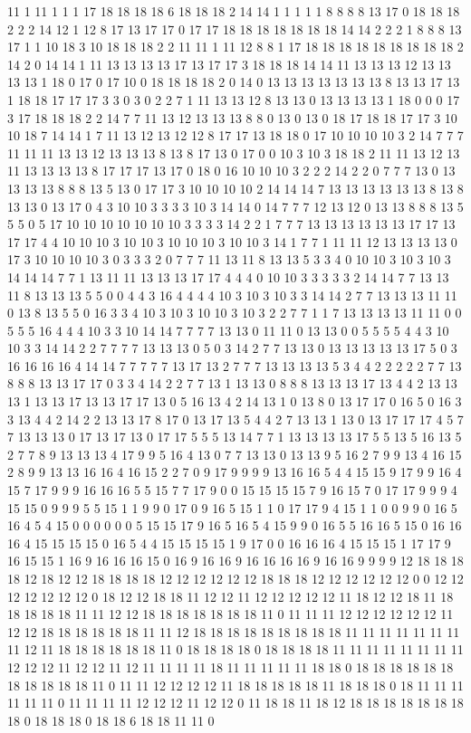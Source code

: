 11 1 11 1 1 1 17 18 18 18 18 6 18 18 18 2 14 14 1 1 1 1 1 8 8 8 8 13 17 0 18 18 18 2 2 2 14 12 1 12 8 17 13 17 17 0 17 17 18 18 18 18 18 18 18 14 14 2 2 2 1 8 8 8 13 17 1 1 10 18 3 10 18 18 18 2 2 11 11 1 11 12 8 8 1 17 18 18 18 18 18 18 18 18 18 2 14 2 0 14 14 1 11 13 13 13 13 17 13 17 17 3 18 18 18 14 14 11 13 13 13 12 13 13 13 13 1 18 0 17 0 17 10 0 18 18 18 18 2 0 14 0 13 13 13 13 13 13 13 8 13 13 17 13 1 18 18 17 17 17 3 3 0 3 0 2 2 7 1 11 13 13 12 8 13 13 0 13 13 13 13 1 18 0 0 0 17 3 17 18 18 18 2 2 14 7 7 11 13 12 13 13 13 8 8 0 13 0 13 0 18 17 18 18 17 17 3 10 10 18 7 14 14 1 7 11 13 12 13 12 12 8 17 17 13 18 18 0 17 10 10 10 10 3 2 14 7 7 7 11 11 11 13 13 12 13 13 13 8 13 8 17 13 0 17 0 0 10 3 10 3 18 18 2 11 11 13 12 13 11 13 13 13 13 8 17 17 17 13 17 0 18 0 16 10 10 10 3 2 2 2 14 2 2 0 7 7 7 13 0 13 13 13 13 8 8 8 13 5 13 0 17 17 3 10 10 10 10 2 14 14 14 7 13 13 13 13 13 13 8 13 8 13 13 0 13 17 0 4 3 10 10 3 3 3 3 10 3 14 14 0 14 7 7 7 12 13 12 0 13 13 8 8 8 13 5 5 5 0 5 17 10 10 10 10 10 10 10 3 3 3 3 14 2 2 1 7 7 7 13 13 13 13 13 13 17 17 13 17 17 4 4 10 10 10 3 10 10 3 10 10 10 3 10 10 3 14 1 7 7 1 11 11 12 13 13 13 13 0 17 3 10 10 10 10 3 0 3 3 3 2 0 7 7 7 11 13 11 8 13 13 5 3 3 4 0 10 10 3 10 3 10 3 14 14 14 7 7 1 13 11 11 13 13 13 17 17 4 4 4 0 10 10 3 3 3 3 3 2 14 14 7 7 13 13 11 8 13 13 13 5 5 0 0 4 4 3 16 4 4 4 4 10 3 10 3 10 3 3 14 14 2 7 7 13 13 13 11 11 0 13 8 13 5 5 0 16 3 3 4 10 3 10 3 10 10 3 10 3 2 2 7 7 1 1 7 13 13 13 13 11 11 0 0 5 5 5 16 4 4 4 10 3 3 10 14 14 7 7 7 7 13 13 0 11 11 0 13 13 0 0 5 5 5 5 4 4 3 10 10 3 3 14 14 2 2 7 7 7 7 13 13 13 0 5 0 3 14 2 7 7 13 13 0 13 13 13 13 13 17 5 0 3 16 16 16 16 4 14 14 7 7 7 7 7 13 17 13 2 7 7 7 13 13 13 13 5 3 4 4 2 2 2 2 2 7 7 13 8 8 8 13 13 17 17 0 3 3 4 14 2 2 7 7 13 1 13 13 0 8 8 8 13 13 13 17 13 4 4 2 13 13 13 1 13 13 17 13 13 17 17 13 0 5 16 13 4 2 14 13 1 0 13 8 0 13 17 17 0 16 5 0 16 3 3 13 4 4 2 14 2 2 13 13 17 8 17 0 13 17 13 5 4 4 2 7 13 13 1 13 0 13 17 17 17 4 5 7 7 13 13 13 0 17 13 17 13 0 17 17 5 5 5 13 14 7 7 1 13 13 13 13 17 5 5 13 5 16 13 5 2 7 7 8 9 13 13 13 4 17 9 9 5 16 4 13 0 7 7 13 13 0 13 13 9 5 16 2 7 9 9 13 4 16 15 2 8 9 9 13 13 16 16 4 16 15 2 2 7 0 9 17 9 9 9 9 13 16 16 5 4 4 15 15 9 17 9 9 16 4 15 7 17 9 9 9 16 16 16 5 5 15 7 7 17 9 0 0 15 15 15 15 7 9 16 15 7 0 17 17 9 9 9 4 15 15 0 9 9 9 5 5 15 1 1 9 9 0 17 0 9 16 5 15 1 1 0 17 17 9 4 15 1 1 0 0 9 9 0 16 5 16 4 5 4 15 0 0 0 0 0 0 5 15 15 17 9 16 5 16 5 4 15 9 9 0 16 5 5 16 16 5 15 0 16 16 16 4 15 15 15 15 0 16 5 4 4 15 15 15 15 1 9 17 0 0 16 16 16 4 15 15 15 1 17 17 9 16 15 15 1 16 9 16 16 16 15 0 16 9 16 16 9 16 16 16 16 9 16 16 9 9 9 9 12 18 18 18 18 12 18 12 12 18 18 18 18 12 12 12 12 12 12 18 18 18 12 12 12 12 12 12 0 0 12 12 12 12 12 12 12 0 18 12 12 18 18 11 12 12 11 12 12 12 12 12 11 18 12 12 18 11 18 18 18 18 18 11 11 12 12 18 18 18 18 18 18 18 11 0 11 11 11 12 12 12 12 12 12 11 12 12 18 18 18 18 18 18 11 11 12 18 18 18 18 18 18 18 18 18 11 11 11 11 11 11 11 11 12 11 18 18 18 18 18 18 11 0 18 18 18 18 0 18 18 18 18 11 11 11 11 11 11 11 11 12 12 12 11 12 12 11 12 11 11 11 11 18 11 11 11 11 11 18 18 0 18 18 18 18 18 18 18 18 18 18 18 11 0 11 11 12 12 12 12 11 18 18 18 18 18 11 18 18 18 0 18 11 11 11 11 11 11 0 11 11 11 11 12 12 12 11 12 12 0 11 18 18 11 18 12 18 18 18 18 18 18 18 18 0 18 18 18 0 18 18 6 18 18 11 11 0 